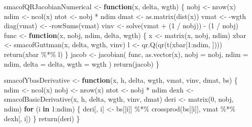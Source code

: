 \documentclass[
  12pt,
  letterpaper,
  DIV=11,
  numbers=noendperiod]{scrartcl}
\newenvironment{Shaded}{\begin{snugshade}}{\end{snugshade}}
\newcommand{\AttributeTok}[1]{\textcolor[rgb]{0.40,0.45,0.13}{#1}}
\newcommand{\ControlFlowTok}[1]{\textcolor[rgb]{0.00,0.23,0.31}{\textbf{#1}}}
\newcommand{\DecValTok}[1]{\textcolor[rgb]{0.68,0.00,0.00}{#1}}
\newcommand{\FunctionTok}[1]{\textcolor[rgb]{0.28,0.35,0.67}{#1}}
\newcommand{\NormalTok}[1]{\textcolor[rgb]{0.00,0.23,0.31}{#1}}
\newcommand{\OtherTok}[1]{\textcolor[rgb]{0.00,0.23,0.31}{#1}}
\newcommand{\SpecialCharTok}[1]{\textcolor[rgb]{0.37,0.37,0.37}{#1}}
\begin{document}
\begin{Shaded}
\begin{Highlighting}[]
\NormalTok{smacofQRJacobianNumerical }\OtherTok{\textless{}{-}} \ControlFlowTok{function}\NormalTok{(x, delta, wgth) \{}
\NormalTok{  nobj }\OtherTok{\textless{}{-}} \FunctionTok{nrow}\NormalTok{(x)}
\NormalTok{  ndim }\OtherTok{\textless{}{-}} \FunctionTok{ncol}\NormalTok{(x)}
\NormalTok{  ntot }\OtherTok{\textless{}{-}}\NormalTok{ nobj }\SpecialCharTok{*}\NormalTok{ ndim}
\NormalTok{  dmat }\OtherTok{\textless{}{-}} \FunctionTok{as.matrix}\NormalTok{(}\FunctionTok{dist}\NormalTok{(x))}
\NormalTok{  vmat }\OtherTok{\textless{}{-}} \SpecialCharTok{{-}}\NormalTok{wgth}
  \FunctionTok{diag}\NormalTok{(vmat) }\OtherTok{\textless{}{-}} \SpecialCharTok{{-}}\FunctionTok{rowSums}\NormalTok{(vmat)}
\NormalTok{  vinv }\OtherTok{\textless{}{-}} \FunctionTok{solve}\NormalTok{(vmat }\SpecialCharTok{+}\NormalTok{ (}\DecValTok{1} \SpecialCharTok{/}\NormalTok{ nobj)) }\SpecialCharTok{{-}}\NormalTok{ (}\DecValTok{1} \SpecialCharTok{/}\NormalTok{ nobj)}
\NormalTok{  func }\OtherTok{\textless{}{-}} \ControlFlowTok{function}\NormalTok{(x, nobj, ndim, delta, wgth) \{}
\NormalTok{    x }\OtherTok{\textless{}{-}} \FunctionTok{matrix}\NormalTok{(x, nobj, ndim)}
\NormalTok{    xbar }\OtherTok{\textless{}{-}} \FunctionTok{smacofGuttman}\NormalTok{(x, delta, wgth, vinv)}
\NormalTok{    l }\OtherTok{\textless{}{-}} \FunctionTok{qr.Q}\NormalTok{(}\FunctionTok{qr}\NormalTok{(}\FunctionTok{t}\NormalTok{(xbar[}\DecValTok{1}\SpecialCharTok{:}\NormalTok{ndim, ])))}
    \FunctionTok{return}\NormalTok{(xbar }\SpecialCharTok{\%*\%}\NormalTok{ l)}
\NormalTok{  \}}
\NormalTok{  jacob }\OtherTok{\textless{}{-}} \FunctionTok{jacobian}\NormalTok{(}
\NormalTok{    func,}
    \FunctionTok{as.vector}\NormalTok{(x),}
    \AttributeTok{nobj =}\NormalTok{ nobj,}
    \AttributeTok{ndim =}\NormalTok{ ndim,}
    \AttributeTok{delta =}\NormalTok{ delta,}
    \AttributeTok{wgth =}\NormalTok{ wgth}
\NormalTok{  )}
  \FunctionTok{return}\NormalTok{(jacob)}
\NormalTok{\}}

\NormalTok{smacofYbasDerivative }\OtherTok{\textless{}{-}} \ControlFlowTok{function}\NormalTok{(x, h, delta, wgth, vmat, vinv, dmat, bs) \{}
\NormalTok{  ndim }\OtherTok{\textless{}{-}} \FunctionTok{ncol}\NormalTok{(x)}
\NormalTok{  nobj }\OtherTok{\textless{}{-}} \FunctionTok{nrow}\NormalTok{(x)}
\NormalTok{  ntot }\OtherTok{\textless{}{-}}\NormalTok{ nobj }\SpecialCharTok{*}\NormalTok{ ndim}
\NormalTok{  dexh }\OtherTok{\textless{}{-}} \FunctionTok{smacofBasicDerivative}\NormalTok{(x, h, delta, wgth, vinv, dmat)}
\NormalTok{  deri }\OtherTok{\textless{}{-}} \FunctionTok{matrix}\NormalTok{(}\DecValTok{0}\NormalTok{, nobj, ndim)}
  \ControlFlowTok{for}\NormalTok{ (i }\ControlFlowTok{in} \DecValTok{1}\SpecialCharTok{:}\NormalTok{ndim) \{}
\NormalTok{    deri[, i] }\OtherTok{\textless{}{-}}\NormalTok{ bs[[i]] }\SpecialCharTok{\%*\%} \FunctionTok{crossprod}\NormalTok{(bs[[i]], vmat }\SpecialCharTok{\%*\%}\NormalTok{ dexh[, i])}
\NormalTok{  \}}
  \FunctionTok{return}\NormalTok{(deri)}
\NormalTok{\}}


\end{Highlighting}
\end{Shaded}
\end{document}
